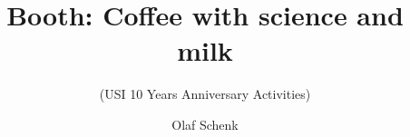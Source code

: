 \documentclass[papersize=a4]{beamer}
\title{\textbf{Booth:} Coffee with science and milk}
\subtitle{(USI 10 Years Anniversary Activities)}
\author{Olaf Schenk\qquad{\small(contact: Dmitry Mikushin, \href{mailto:dmitry.mikushin@usi.ch}{dmitry.mikushin@usi.ch})}}
\institute{}
\date{}
\begin{document}
\begin{frame}
\titlepage
\end{frame}
\end{document}
